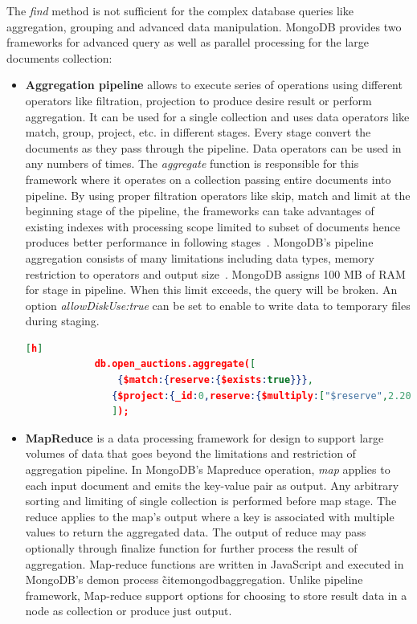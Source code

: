  The \textit{find} method is not sufficient for the complex database queries like aggregation, grouping  and advanced data manipulation. MongoDB provides two frameworks for  advanced query as well as parallel processing for the large documents collection:
 \begin{itemize}
		\item{ \textbf{Aggregation pipeline}} allows to execute series of operations using different operators like filtration, projection to produce desire result or perform aggregation.  It can be used for a single collection and uses  data operators like match, group, project, etc. in different stages. Every stage convert the documents as they pass through the pipeline. Data operators can be used  in any numbers of times.  The \textit{aggregate} function is responsible for this framework where it operates on a collection passing  entire documents into pipeline. By using proper filtration operators like  skip, match and limit at the beginning  stage of the pipeline,  the frameworks can take advantages of existing indexes with processing scope limited to subset of documents  hence produces better performance in following stages~\cite{mongodbaggregation}. MongoDB's pipeline aggregation consists of many limitations including data types, memory restriction to operators and output size~\cite{nosql/comparision}. MongoDB assigns 100 MB of RAM for stage in pipeline. When this limit exceeds, the query will be broken. An option\textit{ allowDiskUse:true}  can be set to enable to write data to temporary files during staging. 
		
				   \begin{lstlisting}[language=JSON,caption=An example Aggregation pipeline in MongoDB, label=mongodb-aggregation-pipeline, basicstyle = \scriptsize][h]
            db.open_auctions.aggregate([
                {$match:{reserve:{$exists:true}}},
		       {$project:{_id:0,reserve:{$multiply:["$reserve",2.20371]}}}
		       ]);
		  \end{lstlisting}
		  
		  \item{\textbf{MapReduce}} is a data processing framework for design to support large volumes of data that goes beyond the limitations and restriction of aggregation pipeline.  In MongoDB's Mapreduce operation,  \textit{map} applies to each input document and emits the key-value pair as output. Any arbitrary sorting and limiting  of single collection is performed before map stage. The reduce applies to the map's output where a key is associated with multiple values to return the aggregated data. The output of reduce may pass optionally through finalize function for further process the result of aggregation. Map-reduce functions are written in JavaScript and executed in MongoDB's demon process \~cite{mongodbaggregation}.  Unlike pipeline framework, Map-reduce support options for choosing to store result  data in a node as collection or  produce just output. 
		  
\end{itemize}		

